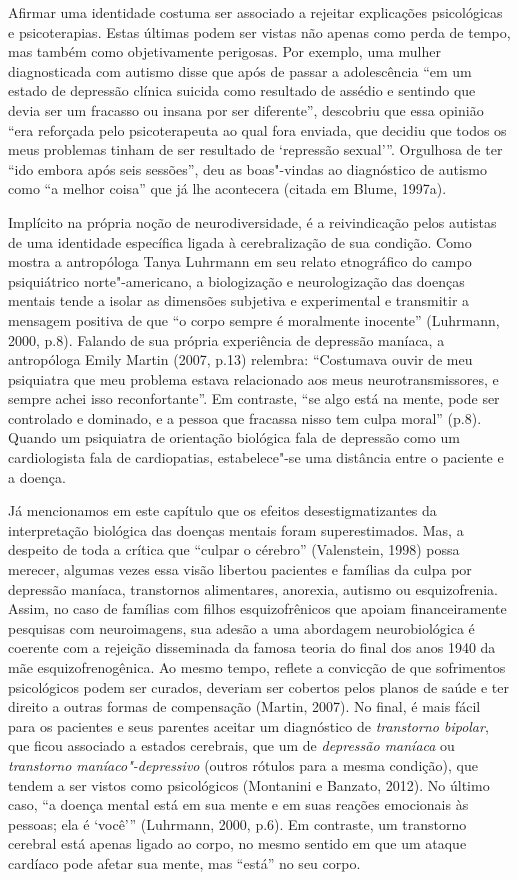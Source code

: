 Afirmar uma identidade costuma ser associado a rejeitar explicações
psicológicas e psicoterapias. Estas últimas podem ser vistas não apenas
como perda de tempo, mas também como objetivamente perigosas. Por
exemplo, uma mulher diagnosticada com autismo disse que após de passar a
adolescência ``em um estado de depressão clínica suicida como resultado
de assédio e sentindo que devia ser um fracasso ou insana por ser
diferente'', descobriu que essa opinião ``era reforçada pelo
psicoterapeuta ao qual fora enviada, que decidiu que todos os meus
problemas tinham de ser resultado de `repressão sexual'''. Orgulhosa de
ter ``ido embora após seis sessões'', deu as boas"-vindas ao diagnóstico
de autismo como ``a melhor coisa'' que já lhe acontecera (citada em
Blume, 1997a).

Implícito na própria noção de neurodiversidade, é a reivindicação pelos
autistas de uma identidade específica ligada à cerebralização de sua
condição. Como mostra a antropóloga Tanya Luhrmann em seu relato
etnográfico do campo psiquiátrico norte"-americano, a biologização e
neurologização das doenças mentais tende a isolar as dimensões subjetiva
e experimental e transmitir a mensagem positiva de que ``o corpo sempre
é moralmente inocente'' (Luhrmann, 2000, p.8). Falando de sua própria
experiência de depressão maníaca, a antropóloga Emily Martin (2007,
p.13) relembra: ``Costumava ouvir de meu psiquiatra que meu problema
estava relacionado aos meus neurotransmissores, e sempre achei isso
reconfortante''. Em contraste, ``se algo está na mente, pode ser
controlado e dominado, e a pessoa que fracassa nisso tem culpa moral''
(p.8). Quando um psiquiatra de orientação biológica fala de depressão
como um cardiologista fala de cardiopatias, estabelece"-se uma distância
entre o paciente e a doença.

Já mencionamos em este capítulo que os efeitos desestigmatizantes da
interpretação biológica das doenças mentais foram superestimados. Mas, a
despeito de toda a crítica que ``culpar o cérebro'' (Valenstein, 1998)
possa merecer, algumas vezes essa visão libertou pacientes e famílias da
culpa por depressão maníaca, transtornos alimentares, anorexia, autismo
ou esquizofrenia. Assim, no caso de famílias com filhos esquizofrênicos
que apoiam financeiramente pesquisas com neuroimagens, sua adesão a uma
abordagem neurobiológica é coerente com a rejeição disseminada da famosa
teoria do final dos anos 1940 da mãe esquizofrenogênica. Ao mesmo tempo,
reflete a convicção de que sofrimentos psicológicos podem ser curados,
deveriam ser cobertos pelos planos de saúde e ter direito a outras
formas de compensação (Martin, 2007). No final, é mais fácil para os
pacientes e seus parentes aceitar um diagnóstico de \emph{transtorno
bipolar}, que ficou associado a estados cerebrais, que um de
\emph{depressão maníaca} ou \emph{transtorno maníaco"-depressivo} (outros
rótulos para a mesma condição), que tendem a ser vistos como
psicológicos (Montanini e Banzato, 2012). No último caso, ``a doença
mental está em sua mente e em suas reações emocionais às pessoas; ela é
`você''' (Luhrmann, 2000, p.6). Em contraste, um transtorno cerebral
está apenas ligado ao corpo, no mesmo sentido em que um ataque cardíaco
pode afetar sua mente, mas ``está'' no seu corpo.

